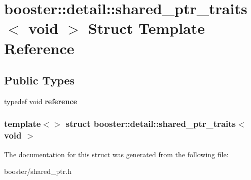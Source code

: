 \section{booster\-:\-:detail\-:\-:shared\-\_\-ptr\-\_\-traits$<$ void $>$ \-Struct \-Template \-Reference}
\label{structbooster_1_1detail_1_1shared__ptr__traits_3_01void_01_4}
\subsection*{\-Public \-Types}
\begin{DoxyCompactItemize}
\item 
typedef void {\bfseries reference}\label{structbooster_1_1detail_1_1shared__ptr__traits_3_01void_01_4_a963de5367a05086b331662727a190fd1}

\end{DoxyCompactItemize}
\subsubsection*{template$<$$>$ struct booster\-::detail\-::shared\-\_\-ptr\-\_\-traits$<$ void $>$}



\-The documentation for this struct was generated from the following file\-:\begin{DoxyCompactItemize}
\item 
booster/shared\-\_\-ptr.\-h\end{DoxyCompactItemize}
